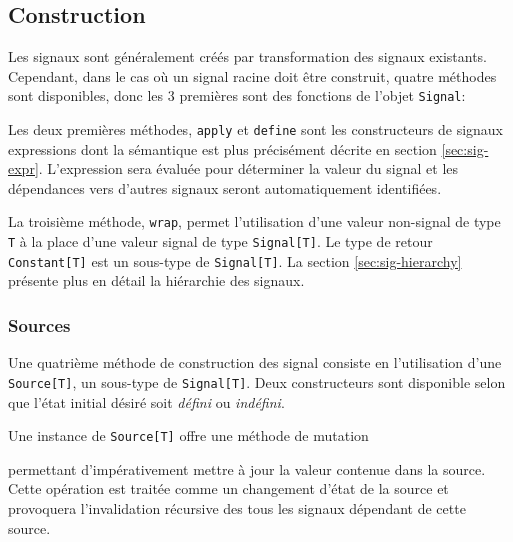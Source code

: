 \subsection{Construction}

Les signaux sont généralement créés par transformation des signaux existants. Cependant, dans le cas où un signal racine doit être construit, quatre méthodes sont disponibles, donc les 3 premières sont des fonctions de l'objet \texttt{Signal}:

\begin{center}
\end{center}

Les deux premières méthodes, \texttt{apply} et \texttt{define} sont les constructeurs de signaux expressions dont la sémantique est plus précisément décrite en section \ref{sec:sig-expr}. L'expression sera évaluée pour déterminer la valeur du signal et les dépendances vers d'autres signaux seront automatiquement identifiées.

La troisième méthode, \texttt{wrap}, permet l'utilisation d'une valeur non-signal de type \texttt{T} à la place d'une valeur signal de type \texttt{Signal[T]}. Le type de retour \texttt{Constant[T]} est un sous-type de \texttt{Signal[T]}. La section \ref{sec:sig-hierarchy} présente plus en détail la hiérarchie des signaux.

\subsubsection{Sources}

Une quatrième méthode de construction des signal consiste en l'utilisation d'une \texttt{Source[T]}, un sous-type de \texttt{Signal[T]}. Deux constructeurs sont disponible selon que l'état initial désiré soit \emph{défini} ou \emph{indéfini}.

\begin{center}
\end{center}

Une instance de \texttt{Source[T]} offre une méthode de mutation
\begin{center}
\end{center}
permettant d'impérativement mettre à jour la valeur contenue dans la source. Cette opération est traitée comme un changement d'état de la source et provoquera l'invalidation récursive des tous les signaux dépendant de cette source.

